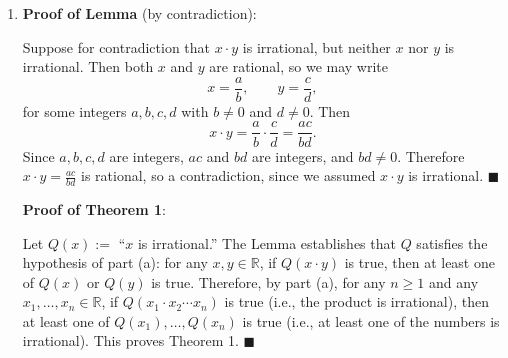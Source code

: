 \documentclass[11pt]{article}
\begin{document}
\begin{enumerate}[label=\textbf{(\alph*)}]
With this choice, part (a) states: if $x_1 \cdot x_2 \cdots x_n$ is irrational, then at least one of $x_1, \ldots, x_n$ is irrational, which is exactly Theorem 1.

However, to apply part (a), we must first verify that $Q$ satisfies the required property from part (a). This gives us the following lemma:

\textbf{Lemma}: For any $x, y \in \mathbb{R}$, if $x \cdot y$ is irrational, then at least one of $x$ or $y$ is irrational.

\item \textbf{Proof of Lemma} (by contradiction):

Suppose for contradiction that $x \cdot y$ is irrational, but neither $x$ nor $y$ is irrational. Then both $x$ and $y$ are rational, so we may write
\[
    x = \frac{a}{b}, \qquad y = \frac{c}{d},
\]
for some integers $a, b, c, d$ with $b \neq 0$ and $d \neq 0$. Then
\[
    x \cdot y = \frac{a}{b} \cdot \frac{c}{d} = \frac{ac}{bd}.
\]
Since $a, b, c, d$ are integers, $ac$ and $bd$ are integers, and $bd \neq 0$. Therefore $x \cdot y = \frac{ac}{bd}$ is rational, so a contradiction, since we assumed $x \cdot y$ is irrational. $\blacksquare$

\newpage

\textbf{Proof of Theorem 1}:

Let $Q(x) :=$ ``$x$ is irrational.'' The Lemma establishes that $Q$ satisfies the hypothesis of part (a): for any $x, y \in \mathbb{R}$, if $Q(x \cdot y)$ is true, then at least one of $Q(x)$ or $Q(y)$ is true. Therefore, by part (a), for any $n \geq 1$ and any $x_1, \ldots, x_n \in \mathbb{R}$, if $Q(x_1 \cdot x_2 \cdots x_n)$ is true (i.e., the product is irrational), then at least one of $Q(x_1), \ldots, Q(x_n)$ is true (i.e., at least one of the numbers is irrational). This proves Theorem 1. $\blacksquare$

\end{enumerate}
\end{document}
